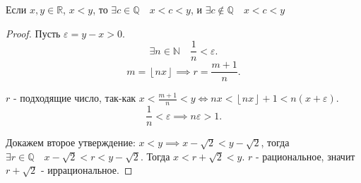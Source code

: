     \begin{theorem}
        Если $x, y \in \mathbb{R}$, $x<y$, то  $\exists{c \in \mathbb{Q}}\quad x<c<y$, и $\exists{c \not\in \mathbb{Q}}\quad x<c<y$
        \begin{proof}
            Пусть $\varepsilon = y-x > 0$.
            \[ \exists{n \in \mathbb{N}}\quad \frac{1}{n}<\varepsilon .\]
            \[ m = \left\lfloor nx\right\rfloor \implies r=\frac{m+1}{n} .\]

            $r$ - подходящие число, так-как  $x < \frac{m+1}{n} < y \iff  nx <  \left\lfloor nx\right\rfloor + 1 < n(x + \varepsilon)$.
            \[ \frac{1}{n} < \varepsilon \implies n\varepsilon > 1 .\] 
            
            Докажем второе утверждение: $x<y \implies x-\sqrt{2}<y-\sqrt{2}  $, тогда $\exists{r \in \mathbb{Q}}\quad x-\sqrt{2} < r < y-\sqrt{2}  $. Тогда $x<r+\sqrt{2}<y $. $r$ - рациональное, значит  $r+\sqrt{2} $ -  иррациональное.
        \end{proof}
    \end{theorem}
